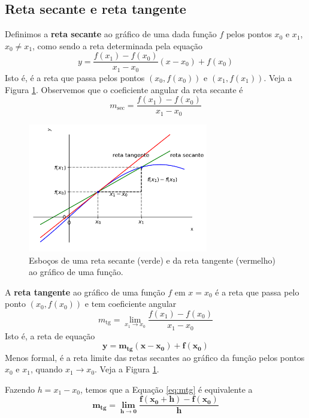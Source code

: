 \cleardoublepage\documentclass[../main.tex]{subfiles}
\begin{document}
\subsection{Reta secante e reta tangente}
Definimos a {\bf reta secante} ao gráfico de uma dada função $f$ pelos pontos $x_0$ e $x_1$, $x_0\neq x_1$, como sendo a reta determinada pela equação
\begin{equation}
  y = \frac{f(x_1)-f(x_0)}{x_1-x_0}(x-x_0)+f(x_0)
\end{equation}
Isto é, é a reta que passa pelos pontos $(x_0,f(x_0))$ e $(x_1,f(x_1))$. Veja a Figura \ref{fig:retsectg}. Observemos que o coeficiente angular da reta secante é
\begin{equation}
  m_{\text{sec}} = \frac{f(x_1)-f(x_0)}{x_1-x_0}
\end{equation}
\begin{figure}[htb]
  \centering
  \includegraphics[width=0.7\textwidth]{fig_deriv/fig_retsectg}
  \caption{Esboços de uma reta secante (verde) e da reta tangente (vermelho) ao gráfico de uma função.}
  \label{fig:retsectg}
\end{figure}

A {\bf reta tangente} ao gráfico de uma função $f$ em $x=x_0$ é a reta que passa pelo ponto $(x_0, f(x_0))$ e tem coeficiente angular
\begin{equation}\label{eq:mtg}
  m_{\text{tg}} = \lim_{x_1\to x_0} \frac{f(x_1)-f(x_0)}{x_1-x_0}
\end{equation}
Isto é, a reta de equação
\begin{equation}
  \boldsymbol{y = m_{\text{tg}}(x-x_0)+f(x_0)}
\end{equation}
Menos formal, é a reta limite das retas secantes ao gráfico da função pelos pontos $x_0$ e $x_1$, quando $x_1\to x_0$. Veja a Figura \ref{fig:retsectg}.

\begin{obs}
  Fazendo $h = x_1-x_0$, temos que a Equação \ref{eq:mtg} é equivalente a
  \begin{equation}
    \boldsymbol{m_{\text{tg}} = \lim_{h\to 0} \frac{f(x_0+h)-f(x_0)}{h}}
  \end{equation}
\end{obs}
\end{document}

